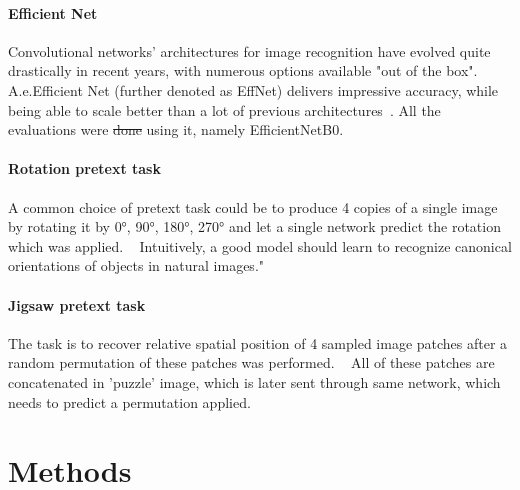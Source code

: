\paragraph{Efficient Net}
Convolutional networks' architectures for image recognition have evolved quite drastically in recent years, with numerous options available "out of the box".
A.e.Efficient Net (further denoted as EffNet) delivers impressive accuracy, while being able to scale better than a lot of previous architectures~\cite{DBLP:journals/corr/abs-1905-11946}.
All the evaluations were \st{done} using it, namely EfficientNetB0.

\paragraph{Rotation pretext task}
A common choice of pretext task could be to produce 4 copies of
a single image by rotating it by {0°, 90°, 180°, 270°} and let a single network predict the rotation which was applied.
~\cite{kolesnikov2019revisiting}
Intuitively, a good model should learn to recognize canonical orientations of objects in natural images."

\paragraph{Jigsaw pretext task}
The task is to recover relative spatial position of 4 sampled image patches after a random permutation of these patches was performed.
~\cite{kolesnikov2019revisiting}
All of these patches are concatenated in 'puzzle' image, which is later sent through same network, which needs to predict a permutation applied.


\section{Methods}


